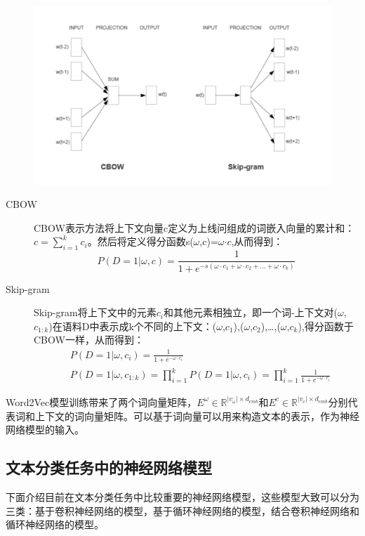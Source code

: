 \documentclass[UTF8]{ctexart}
\begin{document}
	\begin{figure}[H]
		\centering
		\includegraphics[width=0.5\textheight]{cbow_skip}
	\end{figure}
	\begin{description}
		\item[CBOW] CBOW表示方法将上下文向量c定义为上线问组成的词嵌入向量的累计和：$c = \sum_{i=1}^{k}c_i$。然后将定义得分函数s($\omega$,c)=$\omega$$\cdot$$c$,从而得到：
		\begin{displaymath}
			P(D=1 \vert \omega, c)=\frac{1}{1+e^{-s(\omega \cdot c_1+\omega \cdot c_2+\ldots +\omega \cdot c_k)}}
		\end{displaymath}
		\item[Skip-gram] Skip-gram将上下文中的元素$c_i$和其他元素相独立，即一个词-上下文对($\omega$,$c_{1:k}$)在语料D中表示成k个不同的上下文：($\omega$,$c_{1}$),($\omega$,$c_{2}$),\ldots,($\omega$,$c_{k}$),得分函数于CBOW一样，从而得到：
		\begin{align*}
			&P(D=1 \vert \omega, c_i)=\frac{1}{1+e^{-\omega \cdot c_i}}\\
			&P(D=1 \vert \omega, c_{1:k})=\prod_{i=1}^{k}P(D=1 \vert \omega, c_i)=\prod_{i=1}^{k}\frac{1}{1+e^{-\omega \cdot c_i}}
		\end{align*}
	\end{description}
	\par Word2Vec模型训练带来了两个词向量矩阵，$E^{\omega}\in \mathbb{R}^{\vert v_{\omega} \vert \times d_{emb}}$和$E^{c}\in \mathbb{R}^{\vert v_{c} \vert \times d_{emb}}$分别代表词和上下文的词向量矩阵。可以基于词向量可以用来构造文本的表示，作为神经网络模型的输入。

\subsection{文本分类任务中的神经网络模型}
下面介绍目前在文本分类任务中比较重要的神经网络模型，这些模型大致可以分为三类：基于卷积神经网络的模型，基于循环神经网络的模型，结合卷积神经网络和循环神经网络的模型。
\end{document}
